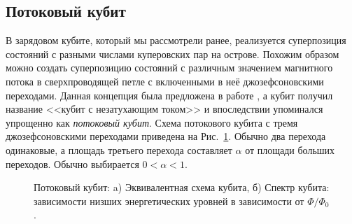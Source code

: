 \subsection{Потоковый кубит}
\label{subsec: flux_q}
В зарядовом кубите, который мы рассмотрели ранее, реализуется суперпозиция состояний с разными числами куперовских пар на острове. Похожим образом можно создать суперпозицию состояний с различным значением магнитного потока в сверхпроводящей петле с включенными в неё джозефсоновскими переходами. Данная концепция была предложена в работе \cite{mooij1999josephson}, а кубит получил название <<кубит с незатухающим током>> и впоследствии упоминался упрощенно как \textit{потоковый кубит}. Схема потокового кубита с тремя джозефсоновскими переходами приведена на Рис.~\ref{img: flux_q}. Обычно два перехода одинаковые, а площадь третьего перехода составляет $\alpha$ от площади больших переходов. Обычно выбирается $0\!<\!\alpha\!<\!1$. 
\begin{figure}[b]
	{ \raggedleft
		\hfill
		\def\svgwidth{3in}
		\fontsize{19pt}{19pt}\selectfont
		\hfill
		
		\hfill
	}
	\caption[Схема потокового кубита и его потенциальная энергия.]{Потоковый кубит: a) Эквивалентная схема кубита, б) Спектр кубита: зависимости низших энергетических уровней в зависимости от $\Phi/\Phi_0$.}
	\label{img: flux_q}
	
\end{figure}

